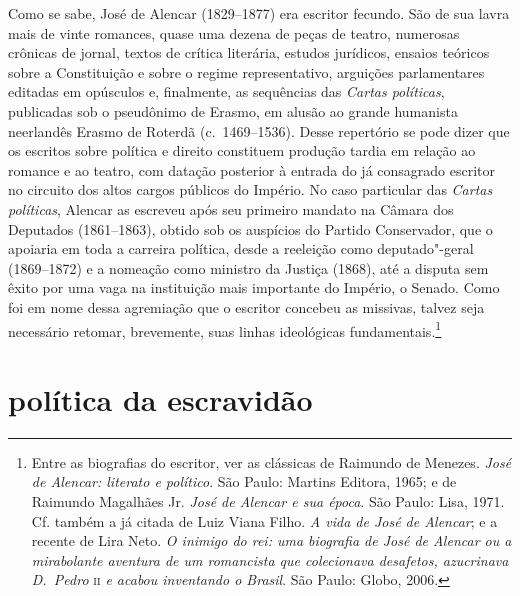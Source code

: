 Como se sabe, José de Alencar (1829--1877) era escritor fecundo. São de
sua lavra mais de vinte romances, quase uma dezena de peças de teatro,
numerosas crônicas de jornal, textos de crítica literária, estudos
jurídicos, ensaios teóricos sobre a Constituição e sobre o regime
representativo, arguições parlamentares editadas em opúsculos e,
finalmente, as sequências das \textit{Cartas políticas}, publicadas sob
o pseudônimo de Erasmo, em alusão ao grande humanista neerlandês Erasmo
de Roterdã (c.~1469--1536). Desse repertório se pode dizer que os
escritos sobre política e direito constituem produção tardia em relação
ao romance e ao teatro, com datação posterior à  entrada do já
consagrado escritor no circuito dos altos cargos públicos do Império.
No caso particular das \textit{Cartas políticas}, Alencar as escreveu
após seu primeiro mandato na Câmara dos Deputados (1861--1863), obtido
sob os auspícios do Partido Conservador, que o apoiaria em toda a
carreira política, desde a reeleição como deputado"-geral
(1869--1872) e a nomeação como ministro da Justiça (1868), até a
disputa sem êxito por uma vaga na instituição mais importante do
Império, o Senado. Como foi em nome dessa agremiação que o escritor
concebeu as missivas, talvez seja necessário retomar, brevemente, suas
linhas ideológicas fundamentais.\footnote{ Entre as biografias do escritor, ver as clássicas de Raimundo de Menezes. 
\textit{José de Alencar: literato e político}. São Paulo: 
Martins Editora, 1965; e de Raimundo Magalhães Jr. \textit{José de Alencar e sua época}. São Paulo: Lisa, 1971. 
Cf. também a já citada de Luiz Viana Filho. \textit{A vida de José de Alencar}; e a recente de Lira Neto. 
\textit{O inimigo do rei: uma biografia de José de Alencar ou a mirabolante aventura de um romancista 
que colecionava desafetos, azucrinava D.~Pedro} \textsc{ii} \textit{e acabou inventando o Brasil}. São Paulo: Globo, 2006.} 

\section{política da escravidão}

